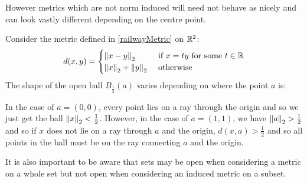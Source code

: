\documentclass[../main.tex]{subfiles}
\begin{document}
However metrics which are not norm induced will need not behave as nicely and can look vastly different depending on the centre point.
\begin{example}
  Consider the metric defined in \cref{railwayMetric} on $\mathbb{R}^2$:
  \[
    d(x, y) = \begin{cases}
    \left\lVert x - y \right\rVert_2 & \text{ if } x = ty \text{ for some } t \in \mathbb{R}\\
    \left\lVert x \right\rVert_2 + \left\lVert y \right\rVert_2 & \text{ otherwise }
    \end{cases}
  \]
  The shape of the open ball $B_{\frac{1}{2}}(a)$ varies depending on where the point $a$ is:
  \begin{center}
  \end{center}
  In the case of $a = (0, 0)$, every point lies on a ray through the origin and so we just get the ball $\left\lVert x \right\rVert_2 < \frac{1}{2}$.
  However, in the case of $a = (1, 1)$, we have $\left\lVert a \right\rVert_2 > \frac{1}{2}$ and so if $x$ does not lie on a ray through $a$ and the origin, $d(x, a) > \frac{1}{2}$ and so all points in the ball must be on the ray connecting $a$ and the origin.
\end{example}
It is also important to be aware that sets may be open when considering a metric on a whole set but not open  when considering an induced metric on a subset.
\end{document}
